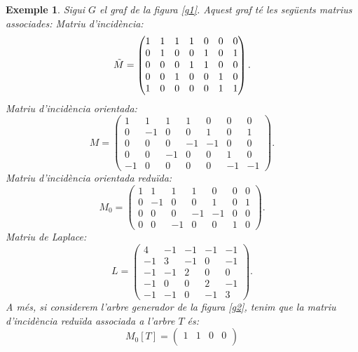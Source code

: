 \documentclass{article}
\newtheorem{example}{Exemple}[section]
\begin{document}
\begin{example}\label{exempl1}
    Sigui $G$ el graf de la figura \ref{g1}. Aquest graf té les següents matrius associades:\newline
    Matriu d'incidència:
    $$\Tilde{M}=
        \begin{pmatrix}
            1 & 1 & 1 & 1 & 0 & 0 & 0 \\
            0 & 1 & 0 & 0 & 1 & 0 & 1 \\
            0 & 0 & 0 & 1 & 1 & 0 & 0 \\
            0 & 0 & 1 & 0 & 0 & 1 & 0 \\
            1 & 0 & 0 & 0 & 0 & 1 & 1
        \end{pmatrix}.
    $$
    Matriu d'incidència orientada:
    $$M=
        \begin{pmatrix}
            1  & 1  & 1  & 1  & 0  & 0  & 0  \\
            0  & -1 & 0  & 0  & 1  & 0  & 1  \\
            0  & 0  & 0  & -1 & -1 & 0  & 0  \\
            0  & 0  & -1 & 0  & 0  & 1  & 0  \\
            -1 & 0  & 0  & 0  & 0  & -1 & -1
        \end{pmatrix}.
    $$
    Matriu d'incidència orientada reduïda:
    $$M_0=
        \begin{pmatrix}
            1 & 1  & 1  & 1  & 0  & 0 & 0 \\
            0 & -1 & 0  & 0  & 1  & 0 & 1 \\
            0 & 0  & 0  & -1 & -1 & 0 & 0 \\
            0 & 0  & -1 & 0  & 0  & 1 & 0
        \end{pmatrix}.
    $$
    Matriu de Laplace:
    $$L=
        \begin{pmatrix}
            4  & -1 & -1 & -1 & -1 \\
            -1 & 3  & -1 & 0  & -1 \\
            -1 & -1 & 2  & 0  & 0  \\
            -1 & 0  & 0  & 2  & -1 \\
            -1 & -1 & 0  & -1 & 3
        \end{pmatrix}.
    $$
    A més, si considerem l'arbre generador de la figura \ref{g2}, tenim que la matriu d'incidència reduïda associada a l'arbre $T$ és:
    $$M_0[T]=
        \begin{pmatrix}
            1  & 1  & 0 & 0 \\

\end{pmatrix}$$
\end{example}
\end{document}
